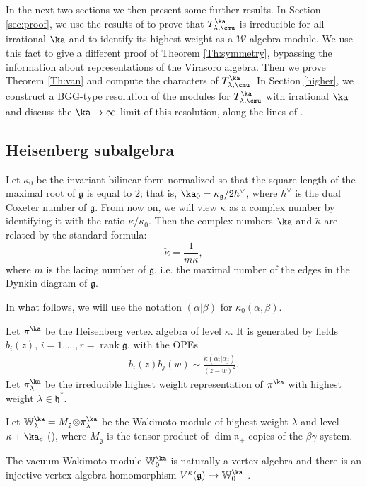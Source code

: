 \documentclass{amsart}
\newcommand{\Wak}[2]{\mathbb{W}_{#1}^{#2}}
\newcommand{\on}{\operatorname}
\newcommand{\+}{\mathop{\oplus}}
\renewcommand{\*}{{\otimes}}
\newcommand{\mc}{\mathcal}
\newcommand{\mf}{\mathfrak}
\newcommand{\g}{\mf{g}}
\newcommand{\h}{\mf{h}}
\newcommand{\lam}{\lambda}
\theoremstyle{theorem}
\theoremstyle{remark}
\numberwithin{equation}{section}
\begin{document}
In the next two sections we then present some further results.  In
Section \ref{sec:proof}, we use the results of \cite{Ara04,Ara07} to
prove that $T^\ka_{\lam,\cmu}$ is irreducible for all irrational $\ka$
and to identify its highest weight as a ${\mc W}$-algebra module. We
use this fact to give a different proof of Theorem \ref{Th:symmetry},
bypassing the information about representations of the Virasoro
algebra. Then we prove Theorem \ref{Th:van} and compute the characters
of $T^\ka_{\lam,\cmu}$. In Section \ref{higher}, we construct a
BGG-type resolution of the modules for $T^\ka_{\lam,\cmu}$ with
irrational $\ka$ and discuss the $\ka \to \infty$ limit of this
resolution, along the lines of \cite{FF93}.

\subsection{Heisenberg subalgebra}

Let $\kappa_0$ be the invariant bilinear form normalized so that the
square length of the maximal root of $\g$ is equal to $2$; that is,
$\ka_0 = \kappa_\g/2h^{\vee}$, where $h^{\vee}$ is the dual Coxeter
number of $\g$.  From now on, we will view $\kappa$ as a complex
number by identifying it with the ratio $\kappa/\kappa_0$.  Then the
complex numbers $\ka$ and $\check{\kappa}$ are related by the standard
formula:
$$\check{\kappa} = \frac{1}{m\kappa},$$
where $m$ is the lacing number of $\g$, i.e. the maximal number of the
edges in the Dynkin diagram of $\g$.

In what follows, we will use the notation $(\alpha|\beta)$ for
$\kappa_0(\alpha,\beta)$.

Let $\pi^\ka$ be the Heisenberg vertex algebra of level $\kappa$.
It is generated by
fields
$b_i(z)$, $i=1,\dots, r=\on{rank}\g$,
with the OPEs
\begin{align}
b_i(z)b_j(w)\sim \frac{\kappa(\alpha_i|\alpha_j)}{(z-w)^2}.
\label{eq:b_i}
\end{align}
Let $\pi^\ka_{\lam}$ be the irreducible highest weight representation
of $\pi^\ka$ with highest weight $\lam\in \h^*$.

Let $\Wak{\lam}{\ka}=M_{\g}\* \pi^\ka_{\lam}$ be the Wakimoto module
of highest weight $\lam$ and level $\kappa+\ka_c$
(\cite{FeuFre90,Fre05}), where $M_{\g}$ is the tensor product of $\dim
\mf{n}_+$ copies of the $\beta\gamma$ system.

The vacuum Wakimoto module $\Wak{0}{\ka}$ is naturally a vertex
algebra and there is an injective vertex algebra homomorphism
$V^\kappa(\g)\hookrightarrow \Wak{0}{\ka}$ \cite{Fre05}.
\end{document}
